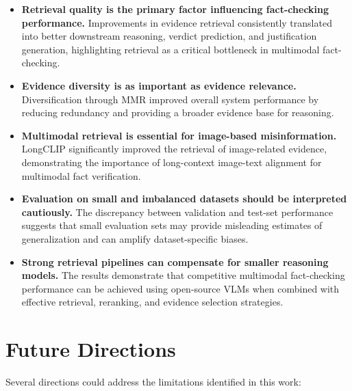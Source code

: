 \begin{itemize}
    \item \textbf{Retrieval quality is the primary factor influencing fact-checking performance.} Improvements in evidence retrieval consistently translated into better downstream reasoning, verdict prediction, and justification generation, highlighting retrieval as a critical bottleneck in multimodal fact-checking.
    
    \item \textbf{Evidence diversity is as important as evidence relevance.} Diversification through MMR improved overall system performance by reducing redundancy and providing a broader evidence base for reasoning.
    
    \item \textbf{Multimodal retrieval is essential for image-based misinformation.} LongCLIP significantly improved the retrieval of image-related evidence, demonstrating the importance of long-context image-text alignment for multimodal fact verification.
    
    \item \textbf{Evaluation on small and imbalanced datasets should be interpreted cautiously.} The discrepancy between validation and test-set performance suggests that small evaluation sets may provide misleading estimates of generalization and can amplify dataset-specific biases.
    
    \item \textbf{Strong retrieval pipelines can compensate for smaller reasoning models.} The results demonstrate that competitive multimodal fact-checking performance can be achieved using open-source VLMs when combined with effective retrieval, reranking, and evidence selection strategies.
\end{itemize}

\section{Future Directions}
\label{sec:conclusions:future}

Several directions could address the limitations identified in this work:

